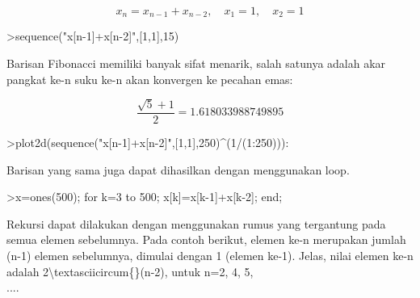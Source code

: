 \documentclass{article}
\begin{document}
\begin{eulernotebook}
\begin{eulercomment}
\begin{eulercomment}
\begin{eulercomment}
\begin{eulercomment}
\begin{eulercomment}
\begin{eulercomment}
\begin{eulercomment}
\begin{eulercomment}
\begin{eulercomment}
\begin{eulercomment}
\begin{eulercomment}
\begin{eulercomment}
\begin{eulercomment}
\begin{eulercomment}
\begin{eulercomment}
\begin{eulercomment}
\begin{eulercomment}
\begin{eulercomment}
\begin{eulercomment}
\begin{eulercomment}
\begin{eulercomment}
\begin{eulercomment}
\begin{eulercomment}
\begin{eulercomment}
\begin{eulercomment}
\begin{eulercomment}
\begin{eulercomment}
\begin{eulercomment}
\begin{eulercomment}
\end{eulercomment}
\begin{eulerformula}
\[
x_n = x_{n-1}+x_{n-2}, \quad x_1=1, \quad x_2 =1
\]
\end{eulerformula}
\begin{eulerprompt}
>sequence("x[n-1]+x[n-2]",[1,1],15)
\end{eulerprompt}
\begin{euleroutput}
  [1,  1,  2,  3,  5,  8,  13,  21,  34,  55,  89,  144,  233,  377,  610]
\end{euleroutput}
\begin{eulercomment}
Barisan Fibonacci memiliki banyak sifat menarik, salah satunya adalah
akar pangkat ke-n suku ke-n akan konvergen ke pecahan emas:
\end{eulercomment}
\begin{eulerformula}
\[
\frac{\sqrt{5}+1}{2}=1.618033988749895
\]
\end{eulerformula}
\begin{eulerprompt}
>plot2d(sequence("x[n-1]+x[n-2]",[1,1],250)^(1/(1:250))):
\end{eulerprompt}
\begin{eulercomment}
Barisan yang sama juga dapat dihasilkan dengan menggunakan loop.
\end{eulercomment}
\begin{eulerprompt}
>x=ones(500); for k=3 to 500; x[k]=x[k-1]+x[k-2]; end;
\end{eulerprompt}
\begin{eulercomment}
Rekursi dapat dilakukan dengan menggunakan rumus yang tergantung pada
semua elemen sebelumnya. Pada contoh berikut, elemen ke-n merupakan
jumlah (n-1) elemen sebelumnya, dimulai dengan 1 (elemen ke-1). Jelas,
nilai elemen ke-n adalah 2\textbackslash{}textasciicircum\{\}(n-2), untuk n=2, 4, 5,\\
....

\end{eulercomment}
\end{eulercomment}
\end{eulercomment}
\end{eulercomment}
\end{eulercomment}
\end{eulercomment}
\end{eulercomment}
\end{eulercomment}
\end{eulercomment}
\end{eulercomment}
\end{eulercomment}
\end{eulercomment}
\end{eulercomment}
\end{eulercomment}
\end{eulercomment}
\end{eulercomment}
\end{eulercomment}
\end{eulercomment}
\end{eulercomment}
\end{eulercomment}
\end{eulercomment}
\end{eulercomment}
\end{eulercomment}
\end{eulercomment}
\end{eulercomment}
\end{eulercomment}
\end{eulercomment}
\end{eulercomment}
\end{eulercomment}
\end{eulernotebook}
\end{document}
